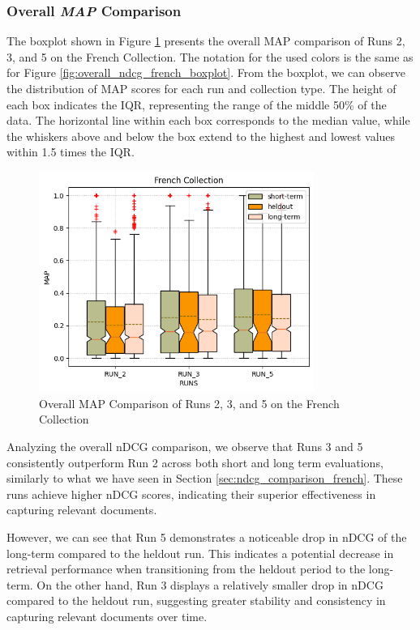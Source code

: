 \subsubsection{Overall \textit{MAP} Comparison}
The boxplot shown in Figure \ref{fig:map_french} presents the overall \ac{MAP} comparison of Runs 2, 3, and 5 on the French Collection.
The notation for the used colors is the same as for Figure \ref{fig:overall_ndcg_french_boxplot}.
From the boxplot, we can observe the distribution of \ac{MAP} scores for each run and collection type. The height of each box indicates the \ac{IQR}, representing the range of the middle 50\% of the data. 
The horizontal line within each box corresponds to the median value, while the whiskers above and below the box extend to the highest and lowest values within 1.5 times the \ac{IQR}.

\begin{figure}[!h]
    \centering
    \includegraphics[width=0.8\textwidth]{figure/StatisticalAnalysis/BoxPlot/MAP French.png}
    \caption{Overall MAP Comparison of Runs 2, 3, and 5 on the French Collection}
    \label{fig:map_french}
\end{figure}

Analyzing the overall \ac{nDCG} comparison, we observe that Runs 3 and 5 consistently outperform Run 2 across both short and long term evaluations, similarly to what we have seen in Section \ref{sec:ndcg_comparison_french}.
These runs achieve higher \ac{nDCG} scores, indicating their superior effectiveness in capturing relevant documents.  

However, we can see that Run 5 demonstrates a noticeable drop in \ac{nDCG} of the long-term compared to the heldout run. 
This indicates a potential decrease in retrieval performance when transitioning from the heldout period to the long-term. 
On the other hand, Run 3 displays a relatively smaller drop in \ac{nDCG} compared to the heldout run, suggesting greater stability and consistency in capturing relevant documents over time.

